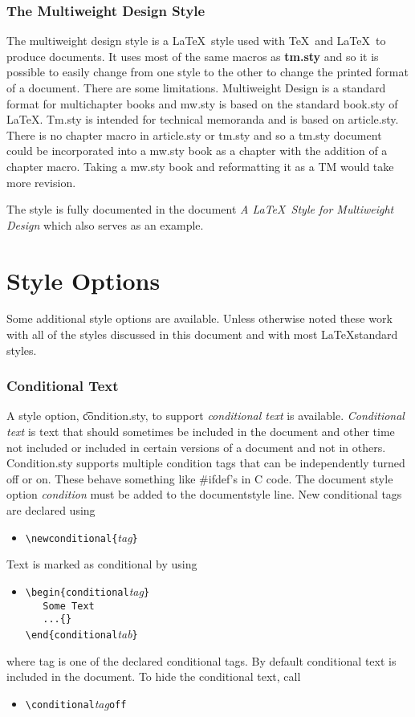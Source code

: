 \section{The Multiweight Design Style} The multiweight design style is
a \LaTeX\ style used with \TeX\ and \LaTeX\ to produce documents.  It
uses most of the same macros as {\bf tm.sty} and so it
is possible to easily change from one style to the other to change the
printed format of a document.  There are some limitations.
Multiweight Design is a standard format for multichapter books and
mw.sty is based on the standard book.sty of \LaTeX .  Tm.sty is
intended for technical memoranda and is based on article.sty.  There
is no chapter macro in article.sty or tm.sty and so a tm.sty document
could be incorporated into a mw.sty book as a chapter with the
addition of a chapter macro.  Taking a mw.sty book and reformatting it
as a TM would take more revision.

The style is fully documented in the document {\it A \LaTeX\ Style for
Multiweight Design} which also serves as an example.

\part{Style Options}
Some additional style options are available.  Unless otherwise noted
these work with all of the styles discussed in this document and with
most \LaTeX standard styles.
\section{Conditional Text}
A style option, {\t condition.sty}, to support {\it conditional text} is
available.  {\it Conditional text} is text that should sometimes be
included in the document and other time not included or included in
certain versions of a document and not in others.  Condition.sty
supports multiple condition tags that can be independently turned off
or on.  These behave something like \#ifdef's in C code. 
The document style option {\it condition} must be added to the documentstyle
line.   New conditional tags are
declared using
\begin{itemize}
\item[]
\verb|\newconditional{|{\it tag}\verb|}|
\end{itemize}
Text is marked as conditional by using
\begin{itemize}
\item[]
\verb|\begin{conditional|{\it tag}\verb|}|\\
\verb|   Some Text|\\
\verb|   ...{}|\\
\verb|\end{conditional|{\it tab}\verb|}|
\end{itemize}
where tag is one of the declared conditional tags.  By default
conditional text is included in the document.  To hide the 
conditional text, call
\begin{itemize}
\item[]
\verb|\conditional|{\it tag}\verb|off|
\end{itemize}

